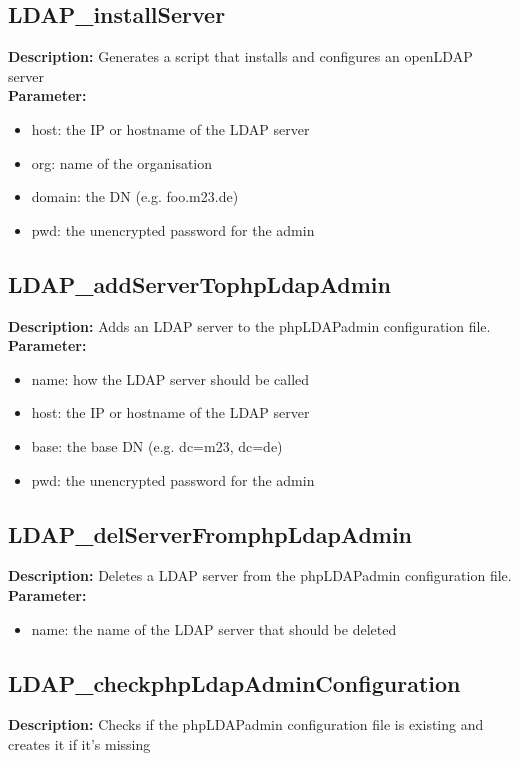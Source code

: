 \subsection{LDAP\_installServer}
\textbf{Description:} Generates a script that installs and configures an openLDAP server\\
\textbf{Parameter:}
\begin{itemize}
\item host: the IP or hostname of the LDAP server
\item org: name of the organisation
\item domain: the DN (e.g. foo.m23.de)
\item pwd: the unencrypted password for the admin
\end{itemize}

\subsection{LDAP\_addServerTophpLdapAdmin}
\textbf{Description:} Adds an LDAP server to the phpLDAPadmin configuration file.\\
\textbf{Parameter:}
\begin{itemize}
\item name: how the LDAP server should be called
\item host: the IP or hostname of the LDAP server
\item base: the base DN (e.g. dc=m23, dc=de)
\item pwd: the unencrypted password for the admin
\end{itemize}

\subsection{LDAP\_delServerFromphpLdapAdmin}
\textbf{Description:} Deletes a LDAP server from the phpLDAPadmin configuration file.\\
\textbf{Parameter:}
\begin{itemize}
\item name: the name of the LDAP server that should be deleted
\end{itemize}

\subsection{LDAP\_checkphpLdapAdminConfiguration}
\textbf{Description:} Checks if the phpLDAPadmin configuration file is existing and creates it if it's missing\\


